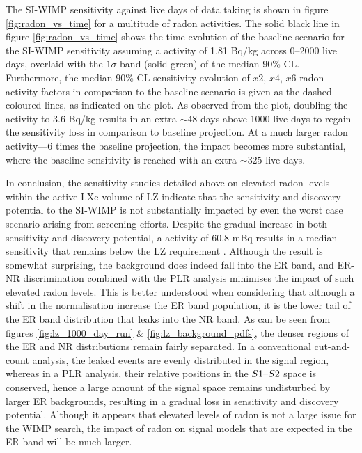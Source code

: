 {The SI-WIMP sensitivity against live days of data taking is shown in figure \ref{fig:radon_vs_time} for a multitude of radon activities. The solid black line in figure \ref{fig:radon_vs_time} shows the time evolution of the baseline scenario for the SI-WIMP sensitivity assuming a \RnTTT{} activity of 1.81 \micro{}Bq/kg across 0--2000 live days, overlaid with the $1\sigma$ band (solid green) of the median 90\% CL. Furthermore, the median 90\% CL sensitivity evolution of $x2$, $x4$, $x6$ radon activity factors in comparison to the baseline scenario is given as the dashed coloured lines, as indicated on the plot. As observed from the plot, doubling the \RnTTT{} activity to 3.6 \micro{}Bq/kg results in an extra $\sim48$ days above 1000 live days to regain the sensitivity loss in comparison to baseline projection. At a much larger radon activity---6 times the baseline projection, the impact becomes more substantial, where the baseline sensitivity is reached with an extra $\sim325$ live days.

In conclusion, the sensitivity studies detailed above on elevated radon levels within the active LXe volume of LZ indicate that the sensitivity and discovery potential to the SI-WIMP is not substantially impacted by even the worst case scenario arising from screening efforts. Despite the gradual increase in both sensitivity and discovery potential, a \RnTTT{} activity of 60.8 mBq results in a median sensitivity that remains below the LZ requirement \cite{lz_tdr, akerib2018projected}. Although the result is somewhat surprising, the \RnTTT{} background does indeed fall into the ER band, and ER-NR discrimination combined with the PLR analysis minimises the impact of such elevated radon levels. This is better understood when considering that although a shift in the \RnTTT{} normalisation increase the ER band population, it is the lower tail of the ER band distribution that leaks into the NR band. As can be seen from figures \ref{fig:lz_1000_day_run} \& \ref{fig:lz_background_pdfs}, the denser regions of the ER and NR distributions remain fairly separated. In a conventional cut-and-count analysis, the leaked events are evenly distributed in the signal region, whereas in a PLR analysis, their relative positions in the $S1\text{--}{}S2$ space is conserved, hence a large amount of the signal space remains undisturbed by larger ER backgrounds, resulting in a gradual loss in sensitivity and discovery potential. Although it appears that elevated levels of radon is not a large issue for the WIMP search, the impact of radon on signal models that are expected in the ER band will be much larger.

}
